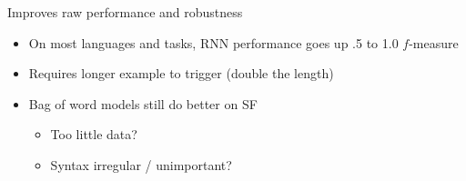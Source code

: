 \documentclass[compress]{beamer}
\begin{document}
\begin{frame}{Improves raw performance and robustness}

\begin{itemize}
  \item On most languages and tasks, RNN performance goes up .5 to 1.0
    $f$-measure
  \item Requires longer example to trigger (double the length)
  \pause
\item Bag of word models still do
better on SF
\begin{itemize}
  \item Too little data?
  \item Syntax irregular / unimportant?
\end{itemize}

\end{itemize}


\end{frame}
\end{document}
